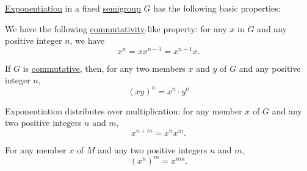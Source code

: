 \begin{proposition}\label{thm:semigroup_exponentiation_properties}
  \hyperref[def:semigroup/exponentiation]{Exponentiation} in a fixed \hyperref[def:semigroup]{semigroup} \( G \) has the following basic properties:

  \begin{thmenum}
     We have the following \hyperref[def:binary_operation/commutative]{commutativity}-like property: for any \( x \) in \( G \) and any positive integer \( n \), we have
    \begin{equation}\label{eq:thm:semigroup_exponentiation_properties/commutativity}
      x^n = x x^{n-1} = x^{n-1} x.
    \end{equation}

     If \( G \) is \hyperref[def:semigroup/commutative]{commutative}, then, for any two members \( x \) and \( y \) of \( G \) and any positive integer \( n \),
    \begin{equation}\label{eq:thm:semigroup_exponentiation_properties/multiplication}
      (xy)^n = x^n \cdot y^n
    \end{equation}

     Exponentiation distributes over multiplication: for any member \( x \) of \( G \) and any two positive integers \( n \) and \( m \),
    \begin{equation}\label{eq:thm:semigroup_exponentiation_properties/distributive}
      x^{n + m} = x^n x^m.
    \end{equation}

     For any member \( x \) of \( M \) and any two positive integers \( n \) and \( m \),
    \begin{equation}\label{eq:thm:semigroup_exponentiation_properties/repeated}
      (x^n)^m = x^{nm}.
    \end{equation}
  \end{thmenum}
\end{proposition}
